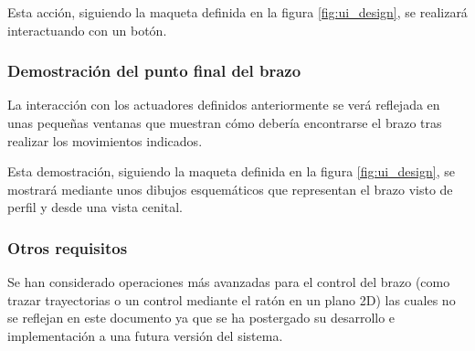 Esta acción, siguiendo la maqueta definida en la figura \ref{fig:ui_design}, se realizará interactuando con
un botón.

\subsubsection*{Demostración del punto final del brazo}
La interacción con los actuadores definidos anteriormente se verá reflejada en unas pequeñas ventanas
que muestran cómo debería encontrarse el brazo tras realizar los movimientos indicados.

Esta demostración, siguiendo la maqueta definida en la figura \ref{fig:ui_design}, se mostrará mediante
unos dibujos esquemáticos que representan el brazo visto de perfil y desde una vista cenital.

\subsubsection*{Otros requisitos}
Se han considerado operaciones más avanzadas para el control del brazo (como trazar trayectorias o
un control mediante el ratón en un plano 2D) las cuales no se reflejan en este documento ya que se
ha postergado su desarrollo e implementación a una futura versión del sistema.
